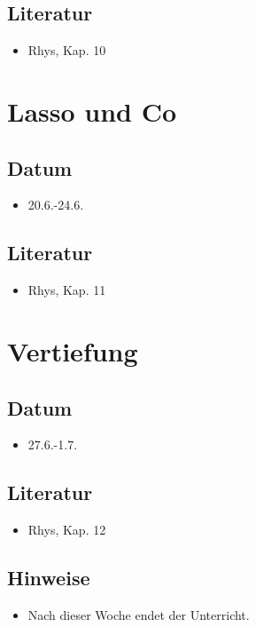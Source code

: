 \documentclass[
]{book}
\providecommand{\tightlist}{%
  \setlength{\itemsep}{0pt}\setlength{\parskip}{0pt}}
\begin{document}
\hypertarget{literatur-11}{%
\subsection{Literatur}\label{literatur-11}}

\begin{itemize}
\tightlist
\item
  Rhys, Kap. 10
\end{itemize}

\hypertarget{lasso-und-co}{%
\section{Lasso und Co}\label{lasso-und-co}}

\hypertarget{datum-13}{%
\subsection{Datum}\label{datum-13}}

\begin{itemize}
\tightlist
\item
  20.6.-24.6.
\end{itemize}

\hypertarget{literatur-12}{%
\subsection{Literatur}\label{literatur-12}}

\begin{itemize}
\tightlist
\item
  Rhys, Kap. 11
\end{itemize}

\hypertarget{vertiefung}{%
\section{Vertiefung}\label{vertiefung}}

\hypertarget{datum-14}{%
\subsection{Datum}\label{datum-14}}

\begin{itemize}
\tightlist
\item
  27.6.-1.7.
\end{itemize}

\hypertarget{literatur-13}{%
\subsection{Literatur}\label{literatur-13}}

\begin{itemize}
\tightlist
\item
  Rhys, Kap. 12
\end{itemize}

\hypertarget{hinweise-5}{%
\subsection{Hinweise}\label{hinweise-5}}

\begin{itemize}
\tightlist
\item
  Nach dieser Woche endet der Unterricht.
\end{itemize}

  
\end{document}
